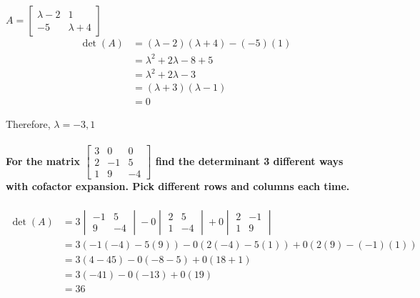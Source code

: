 \documentclass[
  letterpaper,
  DIV=11,
  numbers=noendperiod]{scrartcl}
\let\oldparagraph\paragraph
\renewcommand{\paragraph}[1]{\oldparagraph{#1}\mbox{}}
\begin{document}
\(A = \begin{bmatrix}\lambda-2 & 1 \\ -5 & \lambda+4\end{bmatrix}\)
\begin{align*}
\det(A) &= (\lambda-2)(\lambda+4)-(-5)(1) \\
&= \lambda^2+2\lambda-8+5 \\
&= \lambda^2+2\lambda-3 \\
&= (\lambda+3)(\lambda-1) \\
&= 0
\end{align*}

Therefore, \(\lambda = -3, 1\)

\newpage{}

\hypertarget{for-the-matrix-beginbmatrix3-0-0-2--1-5-1-9--4endbmatrix-find-the-determinant-3-different-ways-with-cofactor-expansion.-pick-different-rows-and-columns-each-time.}{%
\paragraph{\texorpdfstring{For the matrix
\(\begin{bmatrix}3 & 0 & 0 \\2 & -1 & 5 \\ 1 & 9 & -4\end{bmatrix}\)
find the determinant 3 different ways with cofactor expansion. Pick
different rows and columns each
time.}{For the matrix \textbackslash begin\{bmatrix\}3 \& 0 \& 0 \textbackslash\textbackslash2 \& -1 \& 5 \textbackslash\textbackslash{} 1 \& 9 \& -4\textbackslash end\{bmatrix\} find the determinant 3 different ways with cofactor expansion. Pick different rows and columns each time.}}\label{for-the-matrix-beginbmatrix3-0-0-2--1-5-1-9--4endbmatrix-find-the-determinant-3-different-ways-with-cofactor-expansion.-pick-different-rows-and-columns-each-time.}}

\begin{align*}
\det(A) &= 3\begin{vmatrix}-1 & 5 \\ 9 & -4\end{vmatrix}-0\begin{vmatrix}2 & 5 \\ 1 & -4\end{vmatrix}+0\begin{vmatrix}2 & -1 \\ 1 & 9\end{vmatrix} \\
&= 3(-1(-4)-5(9))-0(2(-4)-5(1))+0(2(9)-(-1)(1)) \\
&= 3(4-45)-0(-8-5)+0(18+1) \\
&= 3(-41)-0(-13)+0(19) \\
&= 36
\end{align*}
\end{document}
